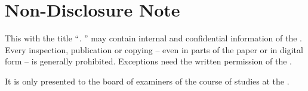 
\chapter*{Non-Disclosure Note}

\thispagestyle{empty}

This {\kind} with the title ``\textit{\myTitle. \mySubtitle}'' may contain internal and confidential information of the \company{}. Every inspection, publication or copying -- even in parts of the paper or in digital form -- is generally prohibited. Exceptions need the written permission of the \company{}.

It is only presented to the board of examiners of the course of studies \study{} at the \university{} \place{}.
